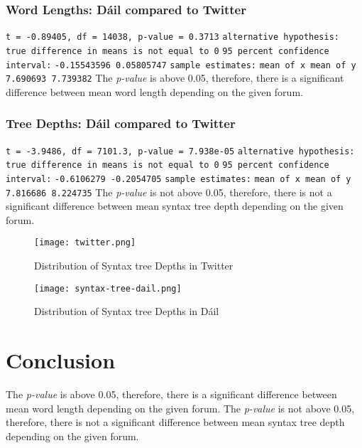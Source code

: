 \documentclass[a4paper,11pt]{article}
\begin{document}
\subsubsection{Word Lengths: Dáil compared to Twitter}
\texttt{t = -0.89405, df = 14038, p-value = 0.3713} \newline
\texttt{alternative hypothesis: true difference in means is not equal to 0} \newline
\texttt{95 percent confidence interval:} \newline
\texttt{-0.15543596  0.05805747} \newline
\texttt{sample estimates:} \newline
\texttt{mean of x mean of y} \newline
\texttt{7.690693  7.739382} \newline
The \textit{p-value} is above 0.05, therefore, there is a significant difference between mean word length depending on the given forum.

 \subsubsection{Tree Depths: Dáil compared to Twitter}
\texttt{t = -3.9486, df = 7101.3, p-value = 7.938e-05} \newline
\texttt{alternative hypothesis: true difference in means is not equal to 0} \newline
\texttt{95 percent confidence interval:} \newline
\texttt{-0.6106279 -0.2054705} \newline
\texttt{sample estimates:} \newline
\texttt{mean of x mean of y} \newline
 \texttt{7.816686  8.224735}
 The \textit{p-value} is not above 0.05, therefore, there is not a significant difference between mean syntax tree depth depending on the given forum.

 \begin{figure}[H]
     \centering
     \texttt{[image: twitter.png]}
     \caption {Distribution of Syntax tree Depths in Twitter}
 \end{figure}

 \begin{figure}[H]
     \centering
     \texttt{[image: syntax-tree-dail.png]}
     \caption {Distribution of Syntax tree Depths in Dáil}
 \end{figure}


\section{Conclusion}
The \textit{p-value} is above 0.05, therefore, there is a significant difference between mean word length depending on the given forum.
\newline
The \textit{p-value} is not above 0.05, therefore, there is not a significant difference between mean syntax tree depth depending on the given forum.
\end{document}
